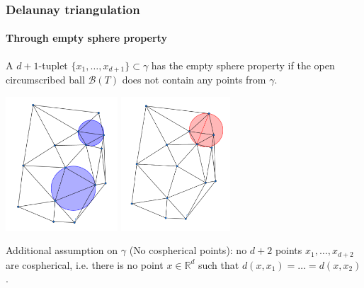 \documentclass[c, 10pt]{beamer}
\begin{document}
\begin{frame}\frametitle{Delaunay triangulation}\framesubtitle{Through empty sphere property}
A $d+1$-tuplet $\{x_1, \dots, x_{d+1}\} \subset \gamma$ has the \alert{empty sphere property} if the open circumscribed ball $\mathcal B(T)$ does not contain any points from $\gamma$. 

\begin{center}
\includegraphics[height = 5cm]{./FigureLayout/DelaunayGood.png}
\includegraphics[height = 5cm]{./FigureLayout/DelaunayBad.png}
\end{center}

Additional assumption on $\gamma$ (\alert{No cospherical points}): no $d+2$ points $x_1, \dots, x_{d+2}$ are cospherical, i.e. there is no point $x\in \mathbb R^d$ such that $d(x,x_1)=\dots =d(x,x_2)$. 

\end{frame}
\end{document}
